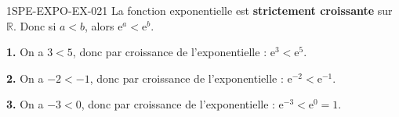 \begin{corrige}{1SPE-EXPO-EX-021}
La fonction exponentielle est \textbf{strictement croissante} sur $\mathbb{R}$. Donc si $a < b$, alors $\mathrm{e}^a < \mathrm{e}^b$.

\textbf{1.} On a $3 < 5$, donc par croissance de l'exponentielle : $\mathrm{e}^3 < \mathrm{e}^5$.

\textbf{2.} On a $-2 < -1$, donc par croissance de l'exponentielle : $\mathrm{e}^{-2} < \mathrm{e}^{-1}$.

\textbf{3.} On a $-3 < 0$, donc par croissance de l'exponentielle : $\mathrm{e}^{-3} < \mathrm{e}^0 = 1$.
\end{corrige}
